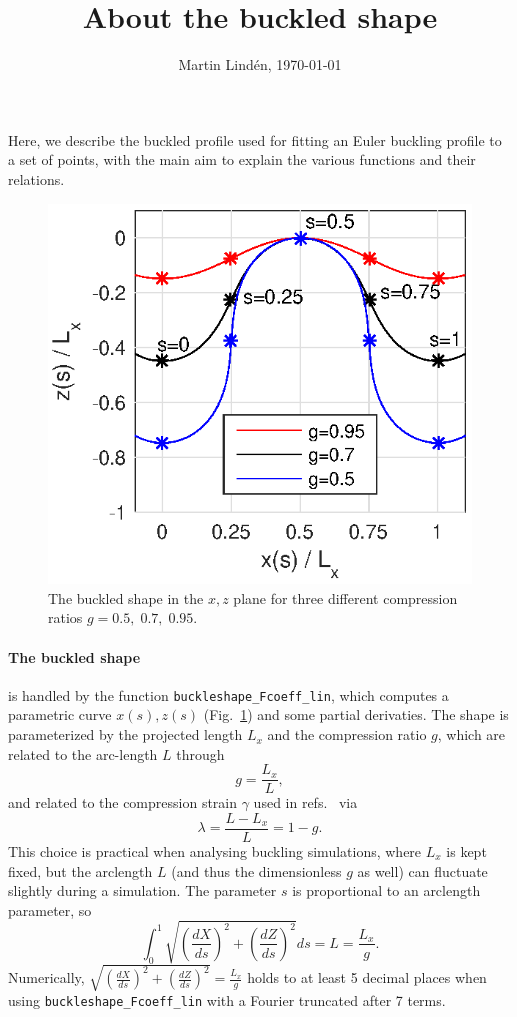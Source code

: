 \documentclass[11pt,a4paper,twocolumn]{article}
\title{About the buckled shape}
\author{Martin Lind\'en,  \today}
\date{}
\begin{document}
\maketitle 
Here, we describe the buckled profile used for fitting an Euler
buckling profile to a set of points, with the main aim to explain the
various functions and their relations.

\begin{figure}
  \includegraphics{figures/buckledshape.eps}
  \caption{\label{fig:buckle} The buckled shape in the $x,z$ plane for
    three different compression ratios $g=0.5,\;0.7,\;0.95$.}
\end{figure}
\paragraph{The buckled shape}
is handled by the function \texttt{buckleshape\_Fcoeff\_lin}, which
computes a parametric curve $x(s),z(s)$ (Fig.~\ref{fig:buckle}) and
some partial derivaties. The shape is parameterized by the projected
length $L_x$ and the compression ratio $g$, which are related to the
arc-length $L$ through
\begin{equation}
  g=\frac{L_x}{L},
\end{equation}
and related to the compression strain $\gamma$ used in
refs.~\cite{gomez2016,hu2013} via
\begin{equation}
  \lambda=\frac{L-L_x}{L}=1-g.
\end{equation}
This choice is practical when analysing buckling simulations, where
$L_x$ is kept fixed, but the arclength $L$ (and thus the dimensionless
$g$ as well) can fluctuate slightly during a simulation. The parameter
$s$ is proportional to an arclength parameter, so 
\begin{equation}
  \int_0^1\sqrt{\left(\frac{dX}{ds}\right)^2+\left(\frac{dZ}{ds}\right)^2}ds
  =L=\frac{L_x}{g}.
\end{equation}
Numerically,
$\sqrt{\left(\frac{dX}{ds}\right)^2+\left(\frac{dZ}{ds}\right)^2} =
\frac{L_x}{g}$ holds to at least 5 decimal places when using
\texttt{buckleshape\_Fcoeff\_lin} with a Fourier truncated after 7
terms.
\end{document}
